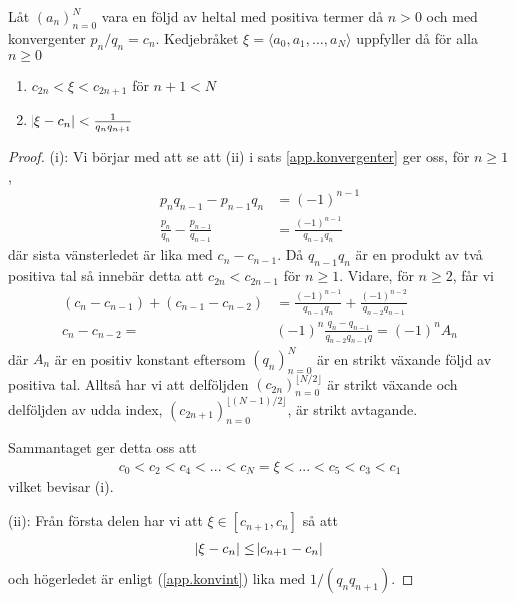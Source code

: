 \begin{theorem} \label{app.kovfel}
    Låt \((a_n)_{n=0}^{N}\) vara en följd av heltal med positiva termer då \(n > 0\) och med konvergenter \(p_n / q_n = c_n\). Kedjebråket \(\xi = \langle a_0, a_1, \dots, a_N \rangle\) uppfyller då för alla \(n \geq 0\)
    \begin{enumerate}
        \item \(c_{2n} < \xi < c_{2n + 1}\) för $n + 1 < N$
        \item \(\abs{\xi - c_n} < \frac{1}{q_n q_{n + 1}}\) %
    \end{enumerate}
\end{theorem}
\begin{proof}
    (i): Vi börjar med att se att (ii) i sats \ref{app.konvergenter} ger oss, för $n \geq 1$,
    \begin{align}
        p_n q_{n-1} - p_{n-1} q_{n} &= (-1)^{n-1} \nonumber \\
        \frac{p_n}{q_n} - \frac{p_{n-1}}{q_{n-1}} &= \frac{(-1)^{n-1}}{q_{n-1} q_n} \label{app.konvint}
    \end{align}
    där sista vänsterledet är lika med \(c_{n} - c_{n-1}\). Då \(q_{n-1} q_n\) är en produkt av två positiva tal så innebär detta att \(c_{2n} < c_{2n-1}\) för \(n \geq 1\). Vidare, för $n \geq 2$, får vi
    \begin{align*}
        (c_n - c_{n-1}) + (c_{n-1} - c_{n-2}) &= \frac{(-1)^{n-1}}{q_{n-1} q_n} + \frac{(-1)^{n-2}}{q_{n-2} q_{n-1}}  \\
        c_n - c_{n-2} =& (-1)^n \frac{q_n - q_{n - 1}}{q_{n-2}q_{n-1}q} = (-1)^{n} A_n 
    \end{align*}
    där $A_n$ är en positiv konstant eftersom $(q_n)_{n=0}^N$ är en strikt växande följd av positiva tal. Alltså har vi att delföljden \((c_{2n})_{n = 0}^{\lfloor N/2 \rfloor}\) är strikt växande och delföljden av udda index, \((c_{2n + 1})_{n = 0}^{\lfloor (N - 1)/2 \rfloor}\), är strikt avtagande. 
    
    Sammantaget ger detta oss att
    \begin{align*}
        c_0 < c_2 < c_4 < ... < c_N = \xi < ... < c_5 < c_3 < c_1
    \end{align*}
    vilket bevisar (i).
    
    (ii): Från första delen har vi att \(\xi \in [c_{n+1}, c_n]\) så att
    \begin{align*}
        \abs{\xi - c_n} \leq \abs{c_{n+1} - c_n} 
    \end{align*}
    och högerledet är enligt (\ref{app.konvint}) lika med \(1 / (q_n q_{n+1})\). 
\end{proof}

